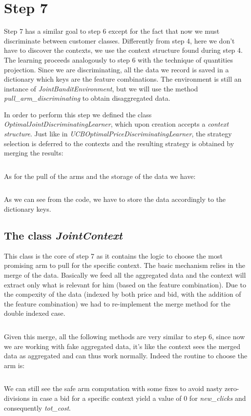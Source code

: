 \documentclass[11pt]{article} %
\begin{document}
\clearpage
\section{Step 7}
Step 7 has a similar goal to step 6 except for the fact that now we must discriminate between customer classes. Differently
from step 4, here we don't have to discover the contexts, we use the context structure found during step 4. The learning
proceeds analogously to step 6 with the technique of quantities projection.
Since we are discriminating, all the data we record is saved in a dictionary which keys are the feature combinations.
The environment is still an instance of \textit{JointBanditEnvironment}, but we will use the method
\textit{pull\_arm\_discriminating} to obtain disaggregated data.

In order to perform this step we defined the class \textit{OptimalJointDiscriminatingLearner}, which upon creation
accepts a \textit{context structure}. Just like in \textit{UCBOptimalPriceDiscriminatingLearner}, the strategy selection
is deferred to the contexts and the resulting strategy is obtained by merging the results:
\inputminted{python}{code/step7_choose_strategy.py}
As for the pull of the arms and the storage of the data we have:
\inputminted{python}{code/step7_pull.py}
As we can see from the code, we have to store the data accordingly to the dictionary keys.

\subsection{The class \textit{JointContext}}
This class is the core of step 7 as it contains the logic to choose the most promising arm to pull for the specific
context.
The basic mechanism relies in the merge of the data. Basically we feed all the aggregated data and the context will
extract only what is relevant for him (based on the feature combination). Due to the compexity of the data (indexed by
both price and bid, with the addition of the feature combination) we had to re-implement the merge method for the
double indexed case.
\inputminted{python}{code/step7_merge.py}

Given this merge, all the following methods are very similar to step 6, since now we are working with fake aggregated data,
it's like the context sees the merged data as aggregated and can thus work normally.
Indeed the routine to choose the arm is:
\inputminted{python}{code/step7_context_arm_choice.py}
We can still see the safe arm computation with some fixes to avoid nasty zero-divisions in case a bid for a specific context
yield a value of 0 for \textit{new\_clicks} and consequently \textit{tot\_cost}.
\end{document}
